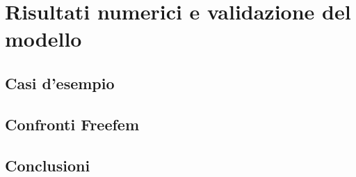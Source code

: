 \chapter{Risultati numerici e validazione del modello} 

\section{Casi d'esempio}

\section{Confronti Freefem}

\section{Conclusioni}